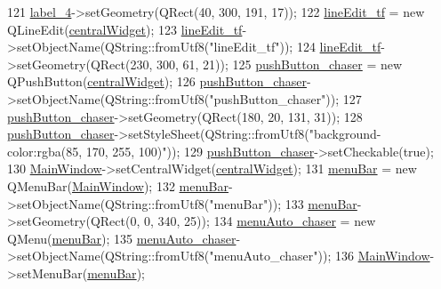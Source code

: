 \begin{DoxyCode}
121         \hyperlink{class_ui___main_window_a78c7e10730b43c6700cd7216911ed76a}{label\_4}->setGeometry(QRect(40, 300, 191, 17));
122         \hyperlink{class_ui___main_window_afc0d94ce5096c619c413cfae9b62014c}{lineEdit\_tf} = \textcolor{keyword}{new} QLineEdit(\hyperlink{class_ui___main_window_a30075506c2116c3ed4ff25e07ae75f81}{centralWidget});
123         \hyperlink{class_ui___main_window_afc0d94ce5096c619c413cfae9b62014c}{lineEdit\_tf}->setObjectName(QString::fromUtf8(\textcolor{stringliteral}{"lineEdit\_tf"}));
124         \hyperlink{class_ui___main_window_afc0d94ce5096c619c413cfae9b62014c}{lineEdit\_tf}->setGeometry(QRect(230, 300, 61, 21));
125         \hyperlink{class_ui___main_window_a9e8499b7c9a9717499abde993da72ed5}{pushButton\_chaser} = \textcolor{keyword}{new} QPushButton(\hyperlink{class_ui___main_window_a30075506c2116c3ed4ff25e07ae75f81}{centralWidget});
126         \hyperlink{class_ui___main_window_a9e8499b7c9a9717499abde993da72ed5}{pushButton\_chaser}->setObjectName(QString::fromUtf8(\textcolor{stringliteral}{"pushButton\_chaser"}));
127         \hyperlink{class_ui___main_window_a9e8499b7c9a9717499abde993da72ed5}{pushButton\_chaser}->setGeometry(QRect(180, 20, 131, 31));
128         \hyperlink{class_ui___main_window_a9e8499b7c9a9717499abde993da72ed5}{pushButton\_chaser}->setStyleSheet(QString::fromUtf8(\textcolor{stringliteral}{"background-color:rgba(85, 170,
       255, 100)"}));
129         \hyperlink{class_ui___main_window_a9e8499b7c9a9717499abde993da72ed5}{pushButton\_chaser}->setCheckable(\textcolor{keyword}{true});
130         \hyperlink{class_main_window}{MainWindow}->setCentralWidget(\hyperlink{class_ui___main_window_a30075506c2116c3ed4ff25e07ae75f81}{centralWidget});
131         \hyperlink{class_ui___main_window_a2be1c24ec9adfca18e1dcc951931457f}{menuBar} = \textcolor{keyword}{new} QMenuBar(\hyperlink{class_main_window}{MainWindow});
132         \hyperlink{class_ui___main_window_a2be1c24ec9adfca18e1dcc951931457f}{menuBar}->setObjectName(QString::fromUtf8(\textcolor{stringliteral}{"menuBar"}));
133         \hyperlink{class_ui___main_window_a2be1c24ec9adfca18e1dcc951931457f}{menuBar}->setGeometry(QRect(0, 0, 340, 25));
134         \hyperlink{class_ui___main_window_a8946bc17fa5b33e1c89ef82fdacab1d8}{menuAuto\_chaser} = \textcolor{keyword}{new} QMenu(\hyperlink{class_ui___main_window_a2be1c24ec9adfca18e1dcc951931457f}{menuBar});
135         \hyperlink{class_ui___main_window_a8946bc17fa5b33e1c89ef82fdacab1d8}{menuAuto\_chaser}->setObjectName(QString::fromUtf8(\textcolor{stringliteral}{"menuAuto\_chaser"}));
136         \hyperlink{class_main_window}{MainWindow}->setMenuBar(\hyperlink{class_ui___main_window_a2be1c24ec9adfca18e1dcc951931457f}{menuBar});

\end{DoxyCode}
